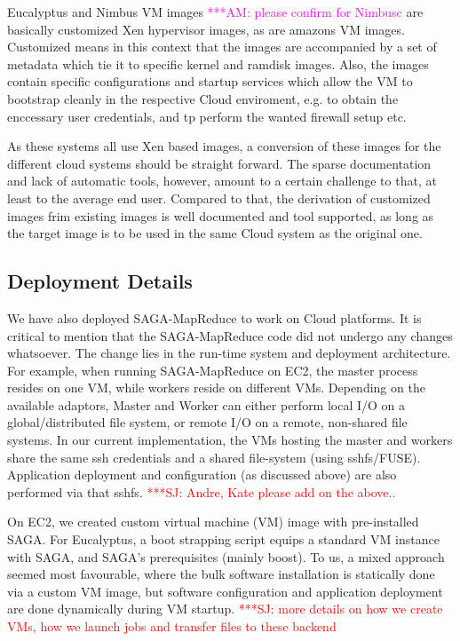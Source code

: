 \documentclass[conference,final]{IEEEtran}
\newcommand{\amnote}[1]{ {\textcolor{magenta} { ***AM: #1c }}}
\newcommand{\jhanote}[1]{ {\textcolor{red} { ***SJ: #1 }}}
\newcommand{\amnote}[1]{}
\newcommand{\jhanote}[1]{}
\newcommand{\sagamapreduce }{SAGA-MapReduce }
\begin{document}
 Eucalyptus and Nimbus VM images \amnote{please confirm for Nimbus}
 are basically customized Xen hypervisor images, as are amazons VM
 images.  Customized means in this context that the images are
 accompanied by a set of metadata which tie it to specific kernel and
 ramdisk images.  Also, the images contain specific configurations and
 startup services which allow the VM to bootstrap cleanly in the
 respective Cloud enviroment, e.g. to obtain the enccessary user
 credentials, and tp perform the wanted firewall setup etc.

 As these systems all use Xen based images, a conversion of these
 images for the different cloud systems should be straight forward.
 The sparse documentation and lack of automatic tools, however, amount
 to a certain challenge to that, at least to the average end user.
 Compared to that, the derivation of customized images frim existing
 images is well documented and tool supported, as long as the target
 image is to be used in the same Cloud system as the original one.





\subsection{Deployment Details}

We have also deployed \sagamapreduce to work on Cloud platforms.  It
is critical to mention that the \sagamapreduce code did not undergo
any changes whatsoever. The change lies in the run-time system and
deployment architecture. For example, when running \sagamapreduce on
EC2, the master process resides on one VM, while workers reside on
different VMs.  Depending on the available adaptors, Master and Worker
can either perform local I/O on a global/distributed file system, or
remote I/O on a remote, non-shared file systems.  In our current
implementation, the VMs hosting the master and workers share the same
ssh credentials and a shared file-system (using sshfs/FUSE).
Application deployment and configuration (as discussed above) are also
performed via that sshfs.  \jhanote{Andre, Kate please add on the
  above..}

On EC2, we created custom virtual machine (VM) image with
pre-installed SAGA.  For Eucalyptus, a boot strapping script equips a
standard VM instance with SAGA, and SAGA's prerequisites (mainly
boost).  To us, a mixed approach seemed most favourable, where the
bulk software installation is statically done via a custom VM image,
but software configuration and application deployment are done
dynamically during VM startup.  \jhanote{more details on how we create
  VMs, how we launch jobs and transfer files to these backend}
\end{document}
